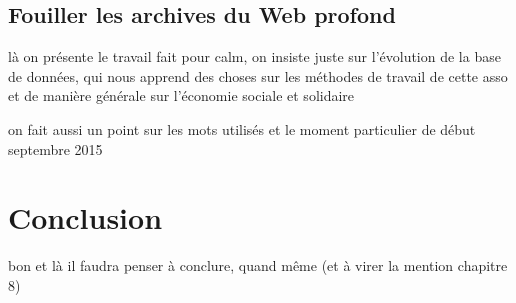 \documentclass[symmetric,justified,marginals=raggedouter]{tufte-book}
\begin{document}
\section{Fouiller les archives du Web profond}

\noindent là on présente le travail fait pour calm, on insiste juste sur l'évolution de la base de données, qui nous apprend des choses sur les méthodes de travail de cette asso et de manière générale sur l'économie sociale et solidaire

\noindent on fait aussi un point sur les mots utilisés et le moment particulier de début septembre 2015 


\chapter{Conclusion}

\noindent bon et là il faudra penser à conclure, quand même (et à virer la mention chapitre 8)









\backmatter





\printindex
\end{document}
